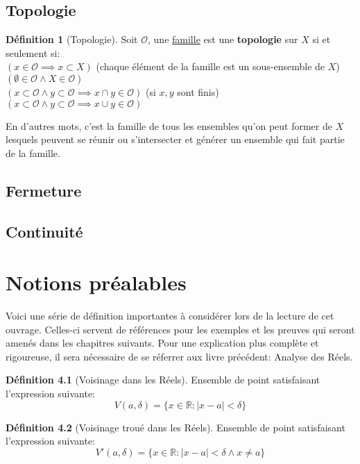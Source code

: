 \documentclass[12pt]{book}
\let\Bbb\mathbb
\theoremstyle{definition}
\newtheorem{definition}{Définition}[section]
\begin{document}
\section{Topologie}
\begin{definition}[Topologie]
    \label{def:topologie} 
    Soit $\mathcal{O}$, une \hyperref[def:famille]{famille} est une \textbf{topologie} sur $X$ si et seulement si:\\
    $(x \in \mathcal{O} \implies x \subset X)$ (chaque élément de la famille est un sous-ensemble de $X$)\\
    $(\emptyset \in \mathcal{O} \land X \in \mathcal{O})$ \\
    $(x \subset \mathcal{O} \land y \subset \mathcal{O} \implies x \cap y \in \mathcal{O})$ (si $x,y$ sont finis) \\
    $(x \subset \mathcal{O} \land y \subset \mathcal{O} \implies x \cup y \in \mathcal{O})$ \\
\end{definition}
En d'autres mots, c'est la famille de tous les ensembles qu'on peut former de $X$ lesquels peuvent se réunir ou s'intersecter et 
générer un ensemble qui fait partie de la famille.
\section{Fermeture}
\section{Continuité}


\appendix
\chapter{Notions préalables}
Voici une série de définition importantes à considérer lors de la lecture de cet ouvrage. Celles-ci servent
de références pour les exemples et les preuves qui seront amenés dans les chapitres suivants. Pour une explication
plus complète et rigoureuse, il sera nécessaire de se réferrer aux livre précédent: Analyse des Réels.

\begin{definition}[Voisinage dans les Réels]
    \label{def:voisinage_reels}
    Ensemble de point satisfaisant l'expression
    suivante: $$V(a, \delta) = \{ x \in \Bbb R : |x - a| < \delta \}$$
\end{definition}

\begin{definition}[Voisinage troué dans les Réels]
    \label{def:voisinage_troue_reels}
    Ensemble de point satisfaisant l'expression
    suivante: $$V'(a, \delta) = \{ x \in \Bbb R : |x - a| < \delta \land x \neq a \}$$
\end{definition}
\end{document}

